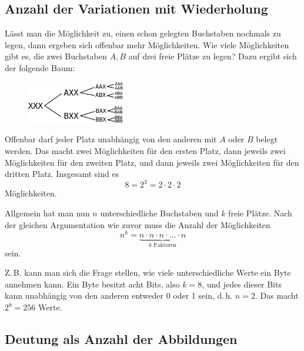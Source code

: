 \subsection{Anzahl der Variationen mit Wiederholung}%

Lässt man die Möglichkeit zu, einen schon gelegten Buchstaben
nochmals zu legen, dann ergeben sich offenbar mehr Möglichkeiten.
Wie viele Möglichkeiten gibt es, die zwei Buchstaben $A,B$
auf drei freie Plätze zu legen? Dazu ergibt sich der folgende
Baum:

\begin{figure}[h]
\begin{center}
\includegraphics[width=0.38\textwidth]{img/VariW-XXX-AB.pdf}
\end{center}
\end{figure}

\noindent
Offenbar darf jeder Platz unabhängig von den anderen mit $A$ oder
$B$ belegt werden. Das macht zwei Möglichkeiten für den ersten
Platz, dann jeweils zwei Möglichkeiten für den zweiten Platz,
und dann jeweils zwei Möglichkeiten für den dritten Platz.
Insgesamt sind es%
\[8 = 2^3 = 2\cdot 2\cdot 2\]
Möglichkeiten.

Allgemein hat man nun $n$ unterschiedliche Buchstaben und $k$
freie Plätze. Nach der gleichen Argumentation wie zuvor muss die
Anzahl der Möglichkeiten%
\[n^k = \underbrace{n\cdot n\cdot n\cdot\ldots\cdot n}_\text{$k$ Faktoren}\]
sein.

Z.\,B. kann man sich die Frage stellen, wie viele unterschiedliche
Werte ein Byte annehmen kann. Ein Byte besitzt acht Bits, also $k=8$,
und jedes dieser Bits kann unabhängig von den anderen entweder 0 oder 1
sein, d.\,h. $n=2$. Das macht $2^8=256$ Werte.

\subsection{Deutung als Anzahl der Abbildungen}


